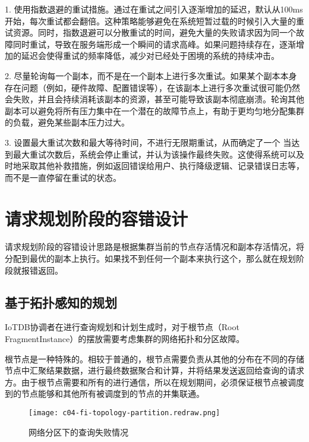 1. 使用指数退避的重试措施。通过在重试之间引入逐渐增加的延迟，默认从100ms开始，每次重试都会翻倍。这种策略能够避免在系统短暂过载的时候引入大量的重试资源。同时，指数退避可以分散重试的时间，避免大量的失败请求因为同一个故障同时重试，导致在服务端形成一个瞬间的请求高峰。如果问题持续存在，逐渐增加的延迟会使得重试的频率降低，减少对已经处于困境的系统的持续冲击。

2. 尽量轮询每一个副本，而不是在一个副本上进行多次重试。如果某个副本本身存在问题（例如，硬件故障、配置错误等），在该副本上进行多次重试很可能仍然会失败，并且会持续消耗该副本的资源，甚至可能导致该副本彻底崩溃。轮询其他副本可以避免将所有压力集中在一个潜在的故障节点上，有助于更均匀地分配集群的负载，避免某些副本压力过大。

3. 设置最大重试次数和最大等待时间，不进行无限期重试，从而确定了一个
当达到最大重试次数后，系统会停止重试，并认为该操作最终失败。这使得系统可以及时地采取其他补救措施，例如返回错误给用户、执行降级逻辑、记录错误日志等，而不是一直停留在重试的状态。


\section{请求规划阶段的容错设计}

请求规划阶段的容错设计思路是根据集群当前的节点存活情况和副本存活情况，将\fragmentinstance 分配到最优的副本上执行。如果找不到任何一个副本来执行这个\fragmentinstance ，那么就在规划阶段就报错返回。

\subsection{基于拓扑感知的规划}\label{sec:topology-query-plan}

IoTDB协调者在进行查询规划和计划生成时，对于根节点\fragmentinstance （Root FragmentInstance）的摆放需要考虑集群的网络拓扑和分区故障。

根节点\fragmentinstance 是一种特殊的\fragmentinstance 。相较于普通的\fragmentinstance ，根节点\fragmentinstance 需要负责从其他的分布在不同的存储节点\fragmentinstance 中汇聚结果数据，进行最终数据聚合和计算，并将结果发送返回给查询的请求方。由于根节点\fragmentinstance 需要和所有的\fragmentinstance 进行通信，所以在规划期间，必须保证根节点\fragmentinstance 被调度到的节点能够和其他所有\fragmentinstance 被调度到的节点的并集联通。


\begin{figure}
  \centering
  \texttt{[image: c04-fi-topology-partition.redraw.png]}
  \caption{网络分区下的查询失败情况}
  \label{fig:fi-topology-partition}
\end{figure}

